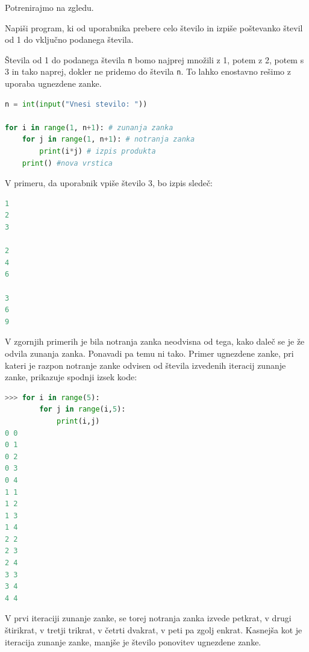 Potrenirajmo na zgledu.

\begin{zgled}
Napiši program, ki od uporabnika prebere celo število in izpiše poštevanko števil od 1 do vključno podanega števila.
\end{zgled}
\begin{resitev}
Števila od 1 do podanega števila \texttt{n} bomo najprej množili z 1, potem z 2, potem s 3 in tako naprej, dokler ne pridemo do števila \texttt{n}. To lahko enostavno rešimo z uporaba ugnezdene zanke.
\begin{lstlisting}[language=Python]
n = int(input("Vnesi stevilo: "))

for i in range(1, n+1): # zunanja zanka
    for j in range(1, n+1): # notranja zanka
        print(i*j) # izpis produkta
    print() #nova vrstica
\end{lstlisting}
V primeru, da uporabnik vpiše število 3, bo izpis sledeč:
\begin{lstlisting}[language=Python]
1
2
3

2
4
6

3
6
9
\end{lstlisting}
\end{resitev}

V zgornjih primerih je bila notranja zanka neodvisna od tega, kako daleč se je že odvila zunanja zanka. Ponavadi pa temu ni tako. Primer ugnezdene zanke, pri kateri je razpon notranje zanke odvisen od števila izvedenih iteracij zunanje zanke, prikazuje spodnji izsek kode:
\begin{lstlisting}[language=Python]
>>> for i in range(5):
        for j in range(i,5):
            print(i,j)
0 0
0 1
0 2
0 3
0 4
1 1
1 2
1 3
1 4
2 2
2 3
2 4
3 3
3 4
4 4
\end{lstlisting}
V prvi iteraciji zunanje zanke, se torej notranja zanka izvede petkrat, v drugi štirikrat, v tretji trikrat, v četrti dvakrat, v peti pa zgolj enkrat. Kasnejša kot je iteracija zunanje zanke, manjše je število ponovitev ugnezdene zanke. 

